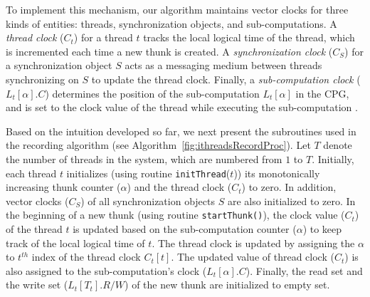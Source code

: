 To implement this mechanism, our algorithm maintains vector clocks for three kinds of
entities: threads,  synchronization objects, and sub-computations.  A {\em thread clock}
($C_t$) for a thread $t$ tracks the local logical time of the thread, which is
incremented each time a new thunk is created. A {\em synchronization clock}
($C_S$) for a synchronization object $S$ acts as a messaging medium  between
threads synchronizing on $S$ to update the thread clock. Finally, a {\em  sub-computation clock}
($L_t[\alpha].C$) determines the position of the sub-computation $L_t[\alpha]$
in the CPG, and is set to the clock value of the thread while executing the
sub-computation . 



Based on the intuition developed so far, we next present the
subroutines used in the recording algorithm (see
Algorithm~\ref{fig:ithreadsRecordProc}). Let $T$ denote the number of threads in the system, which are numbered from $1$ to $T$.  Initially, each thread $t$ initializes (using routine {\tt initThread}($t$)) its monotonically increasing thunk
counter ($\alpha$) and the thread clock ($C_t$) to zero. In addition, vector clocks ($C_S$) of all synchronization objects $S$ are also initialized to zero. 
In the beginning of a new thunk (using routine {\tt startThunk()}), the clock value ($C_t$) of the thread $t$ is
updated based on the sub-computation  counter ($\alpha$) to keep track of the local logical time of $t$. The thread clock is updated by assigning the $\alpha$ to $t^{th}$ index of the thread clock $C_t[t]$. The updated value of thread clock ($C_t$)   is also assigned to the sub-computation's clock ($L_t[\alpha].C$). Finally, the read set and the write set
($L_t[T_t].R/W$) of the new thunk are initialized to empty set.

